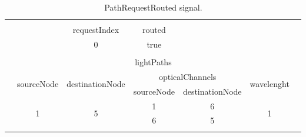 \begin{table}[H]
	\centering
	\begin{tabular}{|lllclll|}
		\hline
		&                                                  &                                                       & \multicolumn{1}{l}{}            &                                      &                                                  &  \\ \cline{3-4}
		& \multicolumn{1}{l|}{}                            & \multicolumn{1}{c|}{requestIndex}                     & \multicolumn{1}{c|}{routed}     &                                      &                                                  &  \\ \cline{3-4}
		& \multicolumn{1}{l|}{}                            & \multicolumn{1}{c|}{0}                                & \multicolumn{1}{c|}{true}       &                                      &                                                  &  \\ \cline{3-4}
		&                                                  &                                                       & \multicolumn{1}{l}{}            &                                      &                                                  &  \\ \cline{2-6}
		\multicolumn{1}{|l|}{} & \multicolumn{5}{c|}{lightPaths}                                                                                                                                                                                                      &  \\ \cline{2-6}
		\multicolumn{1}{|l|}{} & \multicolumn{1}{l|}{\multirow{2}{*}{sourceNode}} & \multicolumn{1}{l|}{\multirow{2}{*}{destinationNode}} & \multicolumn{2}{c|}{opticalChannels}                                   & \multicolumn{1}{l|}{\multirow{2}{*}{wavelenght}} &  \\ \cline{4-5}
		\multicolumn{1}{|l|}{} & \multicolumn{1}{l|}{}                            & \multicolumn{1}{l|}{}                                 & \multicolumn{1}{l|}{sourceNode} & \multicolumn{1}{l|}{destinationNode} & \multicolumn{1}{l|}{}                            &  \\ \cline{2-6}
		\multicolumn{1}{|l|}{} & \multicolumn{1}{c|}{\multirow{2}{*}{1}}          & \multicolumn{1}{c|}{\multirow{2}{*}{5}}               & \multicolumn{1}{c|}{1}          & \multicolumn{1}{c|}{6}               & \multicolumn{1}{c|}{\multirow{2}{*}{1}}          &  \\ \cline{4-5}
		\multicolumn{1}{|l|}{} & \multicolumn{1}{c|}{}                            & \multicolumn{1}{c|}{}                                 & \multicolumn{1}{c|}{6}          & \multicolumn{1}{c|}{5}               & \multicolumn{1}{c|}{}                            &  \\ \cline{2-6}
		&                                                  &                                                       & \multicolumn{1}{l}{}            &                                      &                                                  &  \\ \hline
	\end{tabular}
	\caption{PathRequestRouted signal.}
\end{table}

